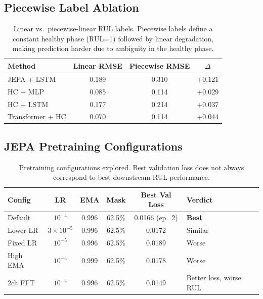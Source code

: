 \subsection{Piecewise Label Ablation}

\begin{table}[h]
\centering
\caption{Linear vs.\ piecewise-linear RUL labels. Piecewise labels define a constant healthy phase (RUL=1) followed by linear degradation, making prediction harder due to ambiguity in the healthy phase.}
\label{tab:piecewise}
\small
\begin{tabular}{@{}lccc@{}}
\toprule
Method & Linear RMSE & Piecewise RMSE & $\Delta$ \\
\midrule
JEPA + LSTM & 0.189 & 0.310 & +0.121 \\
HC + MLP & 0.085 & 0.114 & +0.029 \\
HC + LSTM & 0.177 & 0.214 & +0.037 \\
Transformer + HC & 0.070 & 0.114 & +0.044 \\
\bottomrule
\end{tabular}
\end{table}

\subsection{JEPA Pretraining Configurations}

\begin{table}[h]
\centering
\caption{Pretraining configurations explored. Best validation loss does not always correspond to best downstream RUL performance.}
\label{tab:configs}
\small
\begin{tabular}{@{}lccccl@{}}
\toprule
Config & LR & EMA & Mask & Best Val Loss & Verdict \\
\midrule
Default & $10^{-4}$ & 0.996 & 62.5\% & 0.0166 (ep.\ 2) & \textbf{Best} \\
Lower LR & $3 \times 10^{-5}$ & 0.996 & 62.5\% & 0.0172 & Similar \\
Fixed LR & $10^{-5}$ & 0.996 & 62.5\% & 0.0189 & Worse \\
High EMA & $10^{-4}$ & 0.999 & 62.5\% & 0.0178 & Worse \\
2ch FFT & $10^{-4}$ & 0.996 & 62.5\% & 0.0149 & Better loss, worse RUL \\
\bottomrule
\end{tabular}
\end{table}
